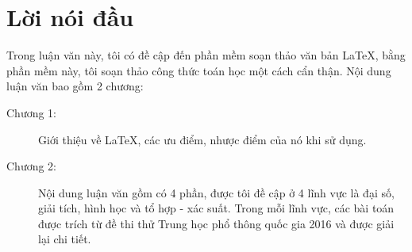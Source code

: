 \chapter*{Lời nói đầu}


Trong luận văn này, tôi có đề cập đến phần mềm soạn thảo văn bản \LaTeX, bằng phần mềm này, tôi soạn thảo công thức toán học một cách cẩn thận. Nội dung luận văn bao gồm 2 chương:

\begin{description}
\item [Chương 1:] Giới thiệu về \LaTeX, các ưu điểm, nhược điểm của nó khi sử dụng.
\item [Chương 2:] Nội dung luận văn gồm có 4 phần, được tôi đề cập ở 4 lĩnh vực là đại số, giải tích, hình học và tổ hợp - xác suất. Trong mỗi lĩnh vực, các bài toán được trích từ đề thi thử Trung học phổ thông quốc gia 2016 và được giải lại chi tiết.
\end{description}

